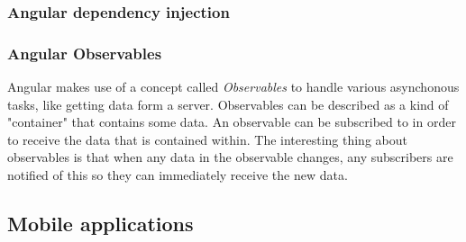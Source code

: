 \subsubsection{Angular dependency injection}

\subsubsection{Angular Observables}

Angular makes use of a concept called \emph{Observables} to handle various asynchonous tasks, like getting data form a server. Observables can be described as a kind of "container" that contains some data. An observable can be subscribed to in order to receive the data that is contained within. The interesting thing about observables is that when any data in the observable changes, any subscribers are notified of this so they can immediately receive the new data.

\subsection{Mobile applications}